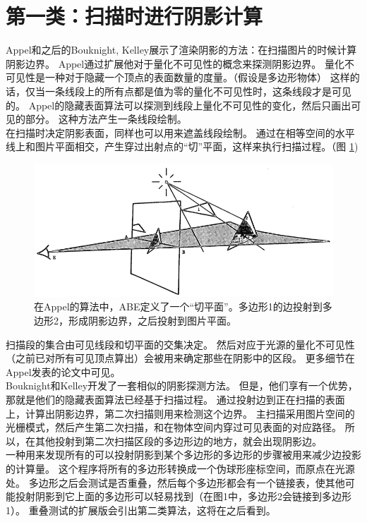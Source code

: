\section{第一类：扫描时进行阴影计算}
Appel\cite{2}\cite{3}和之后的Bouknight, Kelley\cite{5}展示了渲染阴影的方法：在扫描图片的时候计算阴影边界。
Appel通过扩展他对于量化不可见性的概念来探测阴影边界。
量化不可见性是一种对于隐藏一个顶点的表面数量的度量。（假设是多边形物体）
这样的话，仅当一条线段上的所有点都是值为零的量化不可见性时，这条线段才是可见的。
Appel的隐藏表面算法可以探测到线段上量化不可见性的变化，然后只画出可见的部分。
这种方法产生一条线段绘制。\\
在扫描时决定阴影表面，同样也可以用来遮盖线段绘制。
通过在相等空间的水平线上和图片平面相交，产生穿过出射点的“切”平面，这样来执行扫描过程。（图 \ref{fig:fig1})
\begin{figure}[h]
\centering
\includegraphics[width=0.9\linewidth]{fig1}
\caption[fig1]{在Appel的算法中，ABE定义了一个“切平面”。多边形1的边投射到多边形2，形成阴影边界，之后投射到图片平面。}
\label{fig:fig1}
\end{figure}
扫描段的集合由可见线段和切平面的交集决定。
然后对应于光源的量化不可见性（之前已对所有可见顶点算出）会被用来确定那些在阴影中的区段。
更多细节在Appel发表的论文\cite{1}\cite{2}\cite{3}中可见。\\
Bouknight和Kelley开发了一套相似的阴影探测方法\cite{4}\cite{5}。
但是，他们享有一个优势，那就是他们的隐藏表面算法已经基于扫描过程。
通过投射边到正在扫描的表面上，计算出阴影边界，第二次扫描则用来检测这个边界。
主扫描采用图片空间的光栅模式，然后产生第二次扫描，和在物体空间内穿过可见表面的对应路径。
所以，在其他投射到第二次扫描区段的多边形边的地方，就会出现阴影边。\\
一种用来发现所有的可以投射阴影到某个多边形的多边形的步骤被用来减少边投影的计算量。
这个程序将所有的多边形转换成一个伪球形座标空间，而原点在光源处。
多边形之后会测试是否重叠，然后每个多边形都会有一个链接表，使其他可能投射阴影到它上面的多边形可以轻易找到（在图1中，多边形2会链接到多边形1）。
重叠测试的扩展版会引出第二类算法，这将在之后看到。\\
